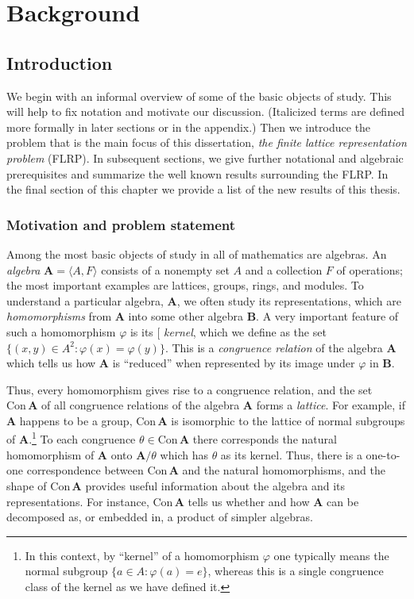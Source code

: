 \documentclass[cm,dissertation,actual,final]{uhthesis}
\theoremstyle{plain}
\theoremstyle{definition}
\theoremstyle{remark}
\numberwithin{theorem}{section}
\numberwithin{claim}{chapter}
\numberwithin{equation}{section}
\numberwithin{conjecture}{chapter}
\newcommand{\<}{\ensuremath{\langle}}
\renewcommand{\>}{\ensuremath{\rangle}}
\newcommand{\Con}{\ensuremath{\mathrm{Con\,}}}
\newcommand{\FLRP}{{\small FLRP}}
\newcommand{\0}{\ensuremath{\mathbf{0}}}
\newcommand{\1}{\ensuremath{\mathbf{1}}}
\newcommand{\2}{\ensuremath{\mathbf{2}}}
\newcommand{\3}{\ensuremath{\mathbf{3}}}
\newcommand{\4}{\ensuremath{\mathbf{4}}}
\newcommand{\5}{\ensuremath{\mathbf{5}}}
\newcommand{\bA}{\ensuremath{\mathbf{A}}}
\newcommand{\bB}{\ensuremath{\mathbf{B}}}
\newcommand{\indexit}[1]{\index{#1|textit}}
\def\defn#1{\gdef\defnstring{#1}%
  \xdef\dodefnii{{\noexpand\em
       \defnstring}\noexpand\indexit{\defnstring}\noexpand\makeatother}%
  \futurelet\nextthing\dodefn}
\def\dodefn{%
  \ifx\nextthing[\let\next=\dodefni
    \else\let\next=\dodefnii\fi
  \makeatletter
  \next}
\def\dodefni[#1]{%
  {\em\defnstring}%
  \indexit{#1}%
  \makeatother}
\begin{document}
\part{Background}

\chapter{Introduction}
\label{cha:introduction}

We begin with an informal overview of some of the basic objects
of study.
This will help to fix notation and motivate our discussion.
(Italicized terms are defined more formally in later sections or
in the appendix.)  Then we 
introduce the problem that is the main focus of this
%
dissertation, \emph{the finite lattice representation problem} (\FLRP).  
In subsequent sections, we give further
notational and algebraic prerequisites and summarize the well known results
surrounding the FLRP.  In the final section of this chapter we provide a list of
the new results of this thesis.

\section{Motivation and problem statement}
Among the most basic objects of study in all of mathematics are algebras.
An 
%
\emph{algebra} 
$\bA = \<A, F\>$ consists of a nonempty set $A$ and a
collection $F$ of operations;  
the most important examples are lattices, groups, rings, and modules.  To
understand a particular algebra, $\bA$, we often study its representations,
which are 
%
\emph{homomorphisms} from $\bA$ into some other algebra $\bB$.
A very important feature of such a homomorphism $\varphi$ is its 
\defn{kernel}, 
which we define as the set $\{(x,y)\in A^2 : \varphi(x) = \varphi(y)\}$.
This is a 
%
\emph{congruence relation}
 of the algebra $\bA$ which tells us how
$\bA$ is ``reduced'' when represented by its image under $\varphi$ in $\bB$.   

Thus, every homomorphism gives rise to a congruence relation, and the set 
$\Con \bA$ of all congruence relations of the algebra $\bA$ forms a 
%
\emph{lattice}.  
For example, if $\bA$ happens to be a group, $\Con \bA$ is isomorphic
to the lattice of normal subgroups  of $\bA$.\footnote{In this context, by
  ``kernel'' of a homomorphism $\varphi$ one typically means the normal subgroup
  $\{a \in A : \varphi(a) = e\}$, whereas 
  this is a single  congruence class of the kernel as we have defined it.}
To each congruence $\theta \in \Con \bA$ there corresponds the natural
homomorphism of $\bA$ onto $\bA/\theta$ which has $\theta$ as its kernel.   
Thus, there is a one-to-one correspondence between
$\Con\bA$ and the natural homomorphisms, and the shape of $\Con\bA$
provides useful information about the algebra and its representations.  
For instance, $\Con \bA$ tells us whether and how $\bA$ can be decomposed as, or
embedded in, a product of simpler algebras. 
\end{document}
